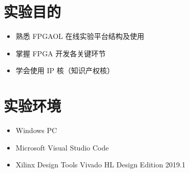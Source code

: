 \documentclass[UTF8,fontset=fandol]{ctexart}
\begin{document}
\section*{实验目的}
\begin{itemize}
  \item 熟悉 FPGAOL 在线实验平台结构及使用
  \item 掌握 FPGA 开发各关键环节
  \item 学会使用 IP 核（知识产权核）
\end{itemize}
\section*{实验环境}
\begin{itemize}
  \item Windows PC
  \item Microsoft Visual Studio Code
  \item Xilinx Design Tools Vivado HL Design Edition 2019.1 
\end{itemize}
\end{document}
